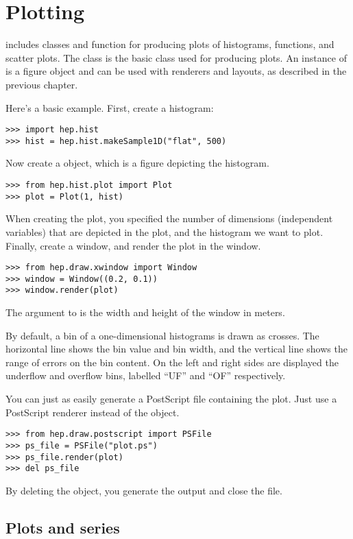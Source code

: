 \chapter{Plotting}

\pyhep includes classes and function for producing plots of histograms,
functions, and scatter plots.  The  class is
the basic class used for producing plots.  An instance of 
is a figure object and can be used with renderers and layouts, as
described in the previous chapter.

Here's a basic example.  First, create a histogram:
\begin{verbatim}
>>> import hep.hist
>>> hist = hep.hist.makeSample1D("flat", 500)
\end{verbatim}
Now create a  object, which is a figure depicting the
histogram.
\begin{verbatim}
>>> from hep.hist.plot import Plot
>>> plot = Plot(1, hist)
\end{verbatim}
When creating the plot, you specified the number of dimensions
(independent variables) that are depicted in the plot, and the histogram
we want to plot.  Finally, create a window, and render the plot in
the window.
\begin{verbatim}
>>> from hep.draw.xwindow import Window
>>> window = Window((0.2, 0.1))
>>> window.render(plot)
\end{verbatim}
The argument to  is the width and height of the window in
meters. 

By default, a bin of a one-dimensional histograms is drawn as crosses.
The horizontal line shows the bin value and bin width, and the vertical
line shows the range of errors on the bin content.  On the left and
right sides are displayed the underflow and overflow bins, labelled
``UF'' and ``OF'' respectively.

You can just as easily generate a PostScript file containing the plot.
Just use a PostScript renderer instead of the  object.
\begin{verbatim}
>>> from hep.draw.postscript import PSFile
>>> ps_file = PSFile("plot.ps")
>>> ps_file.render(plot)
>>> del ps_file
\end{verbatim}
By deleting the  object, you generate the output and close
the file. 


\section{Plots and series}

